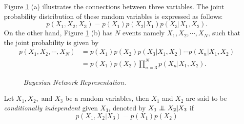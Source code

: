 \begin{exmp}\label{exmp:directgraph}
Figure \ref{fig:baysnet} (a) illustrates the connections between three variables. The joint probability distribution of these random variables is expressed as follows:
$$
p(X_1,X_2,X_3)=p(X_1)p(X_2|X_1)p(X_3|X_1,X_2).
$$
On the other hand, Figure \ref{fig:baysnet} (b) has $N$ events namely $X_1,X_2,\cdots, X_N$, such that the joint probability is given by
$$
\begin{aligned}
p(X_1,X_2,\cdots,X_N)&=p(X_1)p(X_2)p(X_3|X_1,X_2)\cdots p(X_n|X_1,X_2)\\
&= p(X_1) p(X_2)\prod_{n=3}^{N} p(X_n|X_1,X_2).
\end{aligned}
$$
\end{exmp}
\begin{figure}
\begin{minipage}[c]{\textwidth}\centering
\begin{subfigure}[b]{.5\textwidth}
\centering
{}
\end{subfigure}\hspace{-1cm}
\begin{subfigure}[b]{.5\textwidth}
\centering
{}
\end{subfigure}
\end{minipage}
\caption[Bayesian Network Representation]{\it Bayesian Network Representation.}
\label{fig:baysnet}
\end{figure}
\begin{defn}
Let $X_1,X_2,$ and $X_3$ be a random variables, then $X_1$ and $X_2$ are said to be \textit{conditionally independent} given $X_3$, denoted by $X_1\mathrel{\perp\mspace{-10mu}\perp} X_2|X_3$ if
\begin{equation}
    p(X_1,X_2|X_3)=p(X_1)p(X_2)
\end{equation}
\end{defn}
